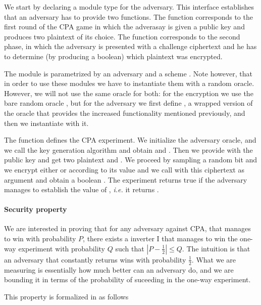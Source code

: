 
We start by declaring a module type for the adversary. This interface
establishes that an adversary has to provide two functions. The
function  corresponds to the first round of the CPA game in
which the adverasay is given a public key  and produces two
plaintext of its choice. The function  corresponds to the
second phase, in which the adversary is presented with a challenge
ciphertext  and he has to determine (by producing a boolean)
which plaintext was encrypted.

The module  is parametrized by an adversary  and a
scheme . Note however, that in order to use these modules we
have to instantiate them with a random oracle. However, we will not
use the same oracle for both: for the encryption we use the bare
random oracle , but for the adversary we first define ,
a wrapped version of the oracle that provides the increased
functionality mentioned previously, and then we instantiate 
with it.

The function  defines the CPA experiment. We initialize the
adversary oracle, and we call the key generation algorithm and obtain
 and . Then we provide  with the public key and get
two plaintext  and . We proceed by sampling a random bit
and we encrypt either  or  according to its value and we
call  with this ciphertext as argument and obtain a boolean
. The experiment returns true if the adversary manages to
establish the value of , {\em i.e.} it returns .

\paragraph{Security property}
We are interested in proving that for any adversary  against CPA,
that manages to win with probability $P$, there exists a inverter
I that manages to win the one-way experiment with probability $Q$ such
that $| P - \frac{1}{2} |\leq Q$. The intuition is that an adversary
that constantly returns  wins with probability
$\frac{1}{2}$. What we are measuring is essentially how much better
can an adversary do, and we are bounding it in terms of the
probability of suceeding in the one-way experiment.

This property is formalized in \EC as follows


